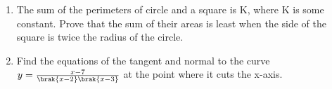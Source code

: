 
\begin{enumerate}

\item The sum of the perimeters of circle and a square is $\text{K}$, where $\text{K}$ is some constant. Prove that the sum of their areas is least when the side of the square is twice the radius of the circle.

\item Find the equations of the tangent and normal to the curve $y = \frac{x - 7}{\brak{x - 2}\brak{x - 3}}$ at the point where it cuts the x-axis.
\end{enumerate}
